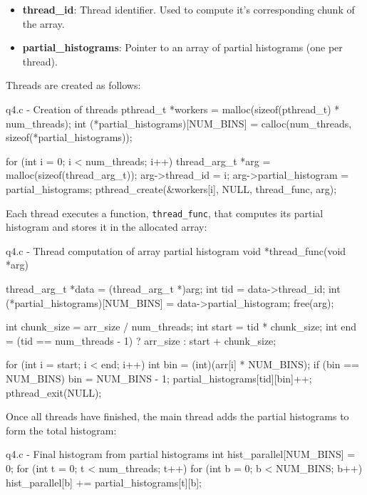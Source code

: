 \documentclass[../main.tex]{subfiles}
\begin{document}
\begin{itemize}
    \item \textbf{thread\_id}: Thread identifier. Used to compute it's corresponding chunk of the array.
    \item \textbf{partial\_histograms}: Pointer to an array of partial histograms (one per thread).
\end{itemize}

\vspace{-10pt}
Threads are created as follows:

\begin{cppcode}{q4.c - Creation of threads}
pthread_t *workers = malloc(sizeof(pthread_t) * num_threads);
int (*partial_histograms)[NUM_BINS] = calloc(num_threads, sizeof(*partial_histograms));

for (int i = 0; i < num_threads; i++)
{
    thread_arg_t *arg = malloc(sizeof(thread_arg_t));
    arg->thread_id = i;
    arg->partial_histogram = partial_histograms;
    pthread_create(&workers[i], NULL, thread_func, arg);
}
\end{cppcode}

Each thread executes a function, \lstinline{thread_func}, that computes its partial histogram and stores it in the allocated array:

\begin{cppcode}{q4.c - Thread computation of array partial histogram}
void *thread_func(void *arg)
{
    thread_arg_t *data = (thread_arg_t *)arg;
    int tid = data->thread_id;
    int (*partial_histograms)[NUM_BINS] = data->partial_histogram;
    free(arg);

    int chunk_size = arr_size / num_threads;
    int start = tid * chunk_size;
    int end = (tid == num_threads - 1) ? arr_size : start + chunk_size;

    for (int i = start; i < end; i++) {
        int bin = (int)(arr[i] * NUM_BINS);
        if (bin == NUM_BINS) bin = NUM_BINS - 1;
        partial_histograms[tid][bin]++;
    }
    pthread_exit(NULL);
}
\end{cppcode}

Once all threads have finished, the main thread adds the partial histograms to form the total histogram:

\begin{cppcode}{q4.c - Final histogram from partial histograms}
int hist_parallel[NUM_BINS] = {0};
for (int t = 0; t < num_threads; t++)
{
    for (int b = 0; b < NUM_BINS; b++)
    {
        hist_parallel[b] += partial_histograms[t][b];
    }
}
\end{cppcode}
\end{document}
